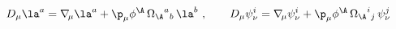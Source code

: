 \begin{equation}
  D_\mu \la^a = \nabla_{\!\mu} \la^a + \p_\mu \phi^\A\, {\Omega_\A}^a
  {}_b\, \la^b\ ,\qquad D_\mu \psi_\nu^i = \nabla_{\!\mu} \psi_\nu^i +
  \p_\mu \phi^\A\, {\Omega_\A}^i{}_j\, \psi_\nu^j
 \end{equation}

